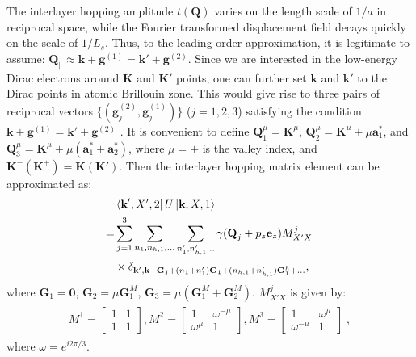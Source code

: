 \documentclass[aps,prx,10pt,twocolumn,superscriptaddress]{revtex4}
\begin{document}
The interlayer hopping amplitude $t(\mathbf{Q})$ varies on the length scale of $1/a$ in reciprocal space, while the  Fourier transformed displacement field decays quickly on the scale of $1/L_s$. Thus, to the leading-order approximation, it is legitimate to assume: $\mathbf{Q}_{\parallel}\approx \mathbf{k}+\mathbf{g}^{(1)}=\mathbf{k'}+\mathbf{g}^{(2)}$. Since we are interested in the low-energy Dirac electrons around $\mathbf{K}$ and $\mathbf{K'}$ points, one can further set $\mathbf{k}$ and $\mathbf{k}'$ to the Dirac points in atomic Brillouin zone. This would give rise to three pairs of reciprocal vectors $\{(\mathbf{g}^{(2)}_j,\mathbf{g}^{(1)}_j)\}$ ($j=1, 2, 3$) satisfying the condition $\mathbf{k}+\mathbf{g}^{(1)}=\mathbf{k}'+\mathbf{g}^{(2)}$ \cite{macdonald-pnas11,castro-neto-prb12,koshino-ep-prb20}.
It is convenient to define $\textbf{Q}_{1}^{\mu}\!=\!\textbf{K}^{\mu}$, $\textbf{Q}_{2}^{\mu}\!=\!\textbf{K}^{\mu}+\mu\textbf{a}^{*}_{1}$, and $\textbf{Q}_{3}^{\mu}\!=\!\textbf{K}^{\mu}+\mu(\textbf{a}^{*}_{1}+\textbf{a}^{*}_{2})$, where $\mu=\pm$ is the valley index, and $\mathbf{K}^{-} (\mathbf{K}^{+})=\mathbf{K} (\mathbf{K}')$. Then the  interlayer hopping matrix element can be approximated as:
\begin{equation}
\begin{split}
&\bra{\textbf{k}',X',2}U\ket{\textbf{k},X,1}\\
=&\sum_{j=1}^{3}\sum_{n_{1},n_{h,1},\dots}\sum_{n_{1}',n'_{h,1}\dots}\gamma(\textbf{Q}_{j}+p_{z}\textbf{e}_{z})M^{j}_{X'X}\,\\
&\times \delta_{\textbf{k}',\textbf{k}+\mathbf{G}_j+(n_{1}+n'_{1})\textbf{G}_{1}+(n_{h,1}+n'_{h,1})\textbf{G}^{h}_{1}+\dots},
\end{split}
\label{eq:hopping-simple}
\end{equation}
where $\mathbf{G}_{1}\!=\!\mathbf{0}$, $\mathbf{G}_{2}\!=\!\mu\textbf{G}^{M}_{1}$, $\textbf{G}_{3}\!=\!\mu(\textbf{G}^{M}_{1}+\textbf{G}^{M}_{2})$. $M^{j}_{X'X}$ is given by:
\begin{align}
\begin{split}
M^{1}=\left[\begin{array}{cc}
				1 & 1 \\
				1 & 1 
\end{array}\right],
M^{2}=\left[\begin{array}{cc}
				1 & \omega^{-\mu} \\
				\omega^{\mu} & 1 
\end{array}\right],
M^{3}=\left[\begin{array}{cc}
				1 & \omega^{\mu} \\
				\omega^{-\mu} & 1 
\end{array}\right]\;,
\end{split}
\end{align}
where $\omega\!=\!e^{i2\pi/3}$. 
\end{document}
